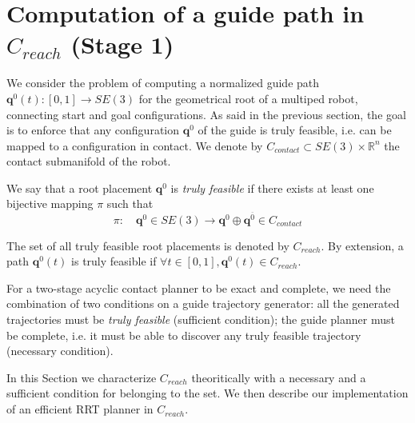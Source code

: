 \section{Computation of a guide path in $C_{reach}$ (Stage 1)}
\label{rbprm}

We consider the problem of computing a normalized guide path $\mathbf{q}^0(t) : [0,1] \longrightarrow SE(3)$ for the geometrical root of a multiped robot, connecting start and goal configurations. As said in the previous section, the goal is to enforce that any configuration $\mathbf{q}^0$ of the guide is truly feasible, i.e. can be mapped to a configuration in contact. We denote by $C_{contact} \subset SE(3) \times \mathbb{R}^n$ the contact submanifold of the robot.

We say that a root placement $\mathbf{q}^{0}$ is \textit{truly feasible} if there exists at least one bijective mapping $\pi$
such that
\begin{equation}
    \pi\colon \quad \mathbf{q}^{0} \in  SE(3) \longrightarrow  \mathbf{q}^{0} \oplus \mathbf{q}^{\overline{0}} \in C_{contact} 
    \label{eq:pi}
\end{equation}

The set of all truly feasible root placements is denoted by $C_{reach}$. By extension, a path $\mathbf{q}^0(t)$ is truly feasible if $\forall t \in [0,1], \mathbf{q}^0(t) \in C_{reach}$.

For a two-stage acyclic contact planner to be exact and complete, we need the combination of two conditions on a guide trajectory generator: all the generated trajectories must be \textit{truly feasible} (sufficient condition); the guide planner must be complete, i.e. it must be able to discover any truly feasible trajectory (necessary condition).

In this Section we characterize $C_{reach}$ theoritically with a necessary and a sufficient condition for belonging to the set.
We then describe our implementation of an efficient RRT planner in $C_{reach}$.

